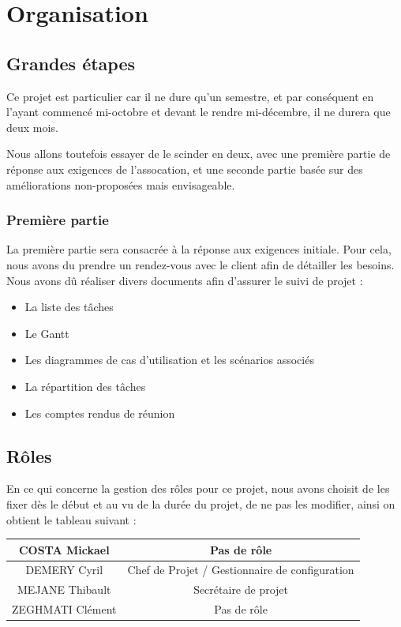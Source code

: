 \documentclass[11pt]{report}
\begin{document}
\section{Organisation}
\subsection{Grandes étapes}
Ce projet est particulier car il ne dure qu'un semestre, et par conséquent en 
l'ayant commencé mi-octobre et devant le rendre mi-décembre, il ne durera que 
deux mois. \\
\par Nous allons toutefois essayer de le scinder en deux, avec une première 
partie de réponse aux exigences de l'assocation, et une seconde partie basée 
sur des améliorations non-proposées mais envisageable.

\subsubsection*{Première partie}
La première partie sera consacrée à la réponse aux exigences initiale. Pour 
cela, nous avons du prendre un rendez-vous avec le client afin de détailler les 
besoins. \\
Nous avons dû réaliser divers documents afin d'assurer le suivi de projet : 
\begin{itemize}
    \item La liste des tâches
    \item Le Gantt
    \item Les diagrammes de cas d'utilisation et les scénarios associés
    \item La répartition des tâches
    \item Les comptes rendus de réunion \\
\end{itemize}

\subsection{Rôles}
En ce qui concerne la gestion des rôles pour ce projet, nous avons choisit de 
les fixer dès le début et au vu de la durée du projet, de ne pas les modifier, 
ainsi on obtient le tableau suivant :  
\par
\begin{tabular}{ | c | c | }
\hline 
   COSTA Mickael & Pas de rôle  \\ \hline 
   DEMERY Cyril & Chef de Projet / Gestionnaire de configuration \\ \hline 
   MEJANE Thibault & Secrétaire de projet \\ \hline 
   ZEGHMATI Clément & Pas de rôle \\ \hline
 \end{tabular}
\end{document}
